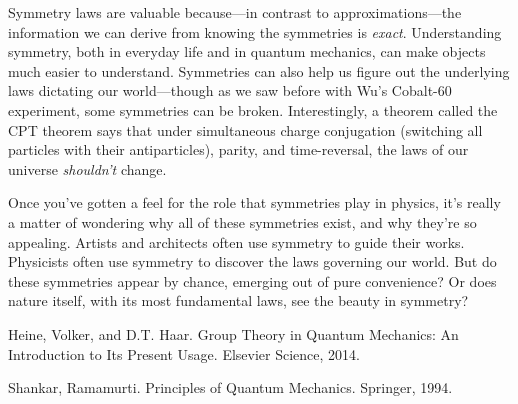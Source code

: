Symmetry laws are valuable because---in contrast to approximations---the information we can derive from knowing the symmetries is \emph{exact}. Understanding symmetry, both in everyday life and in quantum mechanics, can make objects much easier to understand. Symmetries can also help us figure out the underlying laws dictating our world---though as we saw before with Wu's Cobalt-60 experiment, some symmetries can be broken. Interestingly, a theorem called the CPT theorem says that under simultaneous charge conjugation (switching all particles with their antiparticles), parity, and time-reversal, the laws of our universe \emph{shouldn't} change.

Once you've gotten a feel for the role that symmetries play in physics, it's really a matter of wondering why all of these symmetries exist, and why they're so appealing. Artists and architects often use symmetry to guide their works. Physicists often use symmetry to discover the laws governing our world. But do these symmetries appear by chance, emerging out of pure convenience? Or does nature itself, with its most fundamental laws, see the beauty in symmetry?


\begin{thebibliography}{2}

\bibitem{} 
Heine, Volker, and D.T. Haar. Group Theory in Quantum Mechanics: An Introduction to Its Present Usage. Elsevier Science, 2014. 

\bibitem{}
Shankar, Ramamurti. Principles of Quantum Mechanics. Springer, 1994.

\end{thebibliography}
